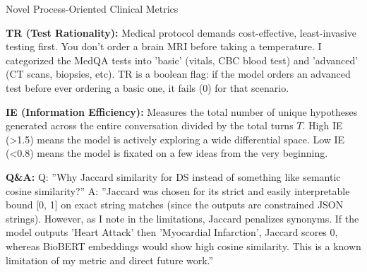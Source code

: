 \documentclass[aspectratio=169,11pt]{beamer}
\begin{document}
\begin{frame}{Novel Process-Oriented Clinical Metrics}
{\textbf{TR (Test Rationality):} Medical protocol demands cost-effective, least-invasive testing first. You don't order a brain MRI before taking a temperature. I categorized the MedQA tests into 'basic' (vitals, CBC blood test) and 'advanced' (CT scans, biopsies, etc). TR is a boolean flag: if the model orders an advanced test before ever ordering a basic one, it fails (0) for that scenario.

\textbf{IE (Information Efficiency):} Measures the total number of unique hypotheses generated across the entire conversation divided by the total turns $T$. High IE (>1.5) means the model is actively exploring a wide differential space. Low IE (<0.8) means the model is fixated on a few ideas from the very beginning.

\textbf{Q\&A:}
Q: ''Why Jaccard similarity for DS instead of something like semantic cosine similarity?''
A: ''Jaccard was chosen for its strict and easily interpretable bound [0, 1] on exact string matches (since the outputs are constrained JSON strings). However, as I note in the limitations, Jaccard penalizes synonyms. If the model outputs 'Heart Attack' then 'Myocardial Infarction', Jaccard scores 0, whereas BioBERT embeddings would show high cosine similarity. This is a known limitation of my metric and direct future work.''
}
\end{frame}
\end{document}
